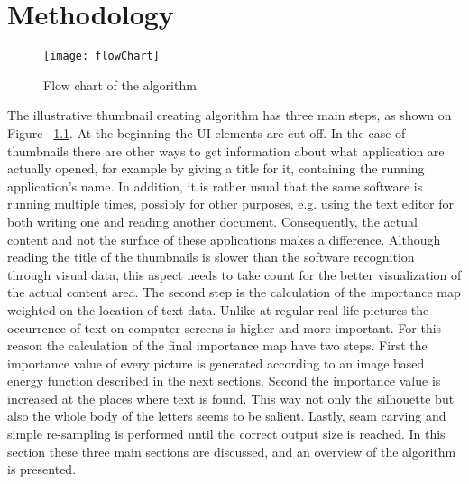 \documentclass[draft,final]{vutinfth} %
\begin{document}
	\chapter{Methodology}
	\begin{figure}
		\centering		
		\texttt{[image: flowChart]}
		\caption{Flow chart of the algorithm}
		\label{fig:flowChart}
	\end{figure}
	The illustrative thumbnail creating algorithm has three main steps, as shown on Figure ~\ref{fig:flowChart}.
	At the beginning the UI elements are cut off.
	In the case of thumbnails there are other ways to get information about what application are actually opened, for example by giving a title for it, containing the running application's name.
	In addition, it is rather usual that the same software is running multiple times, possibly for other purposes, e.g. using the text editor for both writing one and reading another document.
	Consequently, the actual content and not the surface of these applications makes a difference.
	Although reading the title of the thumbnails is slower than the software recognition through visual data, this aspect needs to take count for the better visualization of the actual content area.%
	The second step is the calculation of the importance map weighted on the location of text data.
	Unlike at regular real-life pictures the occurrence of text on computer screens is higher and more important.
	For this reason the calculation of the final importance map have two steps.
	First the importance value of every picture is generated according to an image based energy function described in the next sections.
	Second the importance value is increased at the places where text is found.
	This way not only the silhouette but also the whole body of the letters seems to be salient.
	Lastly, seam carving and simple re-sampling is performed  until the correct output size is reached.
	In this section these three main sections are discussed, and an overview of the algorithm is presented.	
	
\end{document}
